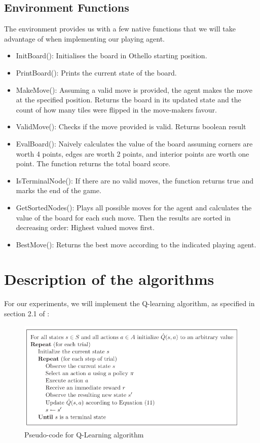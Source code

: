 \documentclass{article}
\begin{document}
\subsection{\label{doc:env_func}Environment Functions}
The environment provides us with a few native functions that we will take advantage of when implementing our playing agent\cite{codes}.
\begin{itemize}
    \item InitBoard(): Initialises the board in Othello starting position.
    \item PrintBoard(): Prints the current state of the board.
    \item MakeMove(): Assuming a valid move is provided, the agent makes the move at the specified position. Returns the board in its updated state and the count of how many tiles were flipped in the move-makers favour.
    \item ValidMove(): Checks if the move provided is valid. Returns boolean result
    \item EvalBoard(): Naively calculates the value of the board assuming corners are worth 4 points, edges are worth 2 points, and interior points are worth one point. The function returns the total board score.
    \item IsTerminalNode(): If there are no valid moves, the function returns true and marks the end of the game.
    \item GetSortedNodes(): Plays all possible moves for the agent and calculates the value of the board for each such move. Then the results are sorted in decreasing order: Highest valued moves first.
    \item BestMove(): Returns the best move according to the indicated playing agent.
\end{itemize}

\section{Description of the algorithms}
For our experiments, we will implement the Q-learning algorithm, as specified in section 2.1 of \cite{vanEck2008}:

\begin{figure}[ht]
\centering
\includegraphics[width=0.85\linewidth]{Q_algo.png}
\caption{\label{fig:Q_algo}Pseudo-code for Q-Learning algorithm}
\end{figure}
\end{document}
